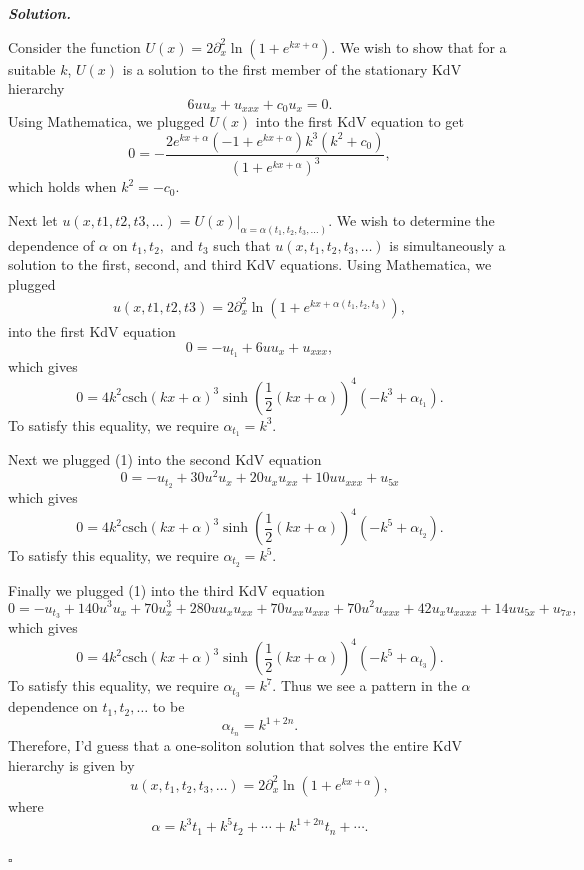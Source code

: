 \documentclass[12pt]{report}
\newenvironment{solution}[1][\it{Solution}]{\textbf{#1. } }{$\square$}
\newcommand{\paren}[1]{{\left(#1\right)}} %
\begin{document}
\begin{solution}

    \noindent
    Consider the function $U(x) = 2\partial_x^2\ln\left(1+e^{kx+\alpha}\right)$. We wish to show that for a suitable $k$, $U(x)$ is a solution to the first member of the stationary KdV hierarchy
    \[ 6uu_x + u_{xxx} + c_0u_x = 0.\]
    Using Mathematica, we plugged $U(x)$ into the first KdV equation to get
    \[ 0 = - \frac{2 e^{k x + \alpha} \paren{-1 + e^{k x + \alpha}}k^3(k^2+c_0)}{(1 + e^{k x + \alpha})^3},\]
    which holds when $k^2 = -c_0$. 
    
    \noindent
    Next let $u(x,t1,t2,t3,\ldots) = \left. U(x) \right|_{\alpha = \alpha(t_1,t_2,t_3,\ldots)}$. We wish to determine the dependence of $\alpha$ on $t_1, t_2,$ and $t_3$ such that $u(x,t_1,t_2,t_3,\ldots)$ is simultaneously a solution to the first, second, and third KdV equations. Using Mathematica, we plugged
    \begin{align}
        u(x,t1,t2,t3) = 2\partial_x^2\ln\left(1+e^{kx+\alpha(t_1,t_2,t_3)}\right),
    \end{align} 
    into the first KdV equation
    \[ 
        0 = - u_{t_1} + 6 u u_x+u_{xxx},
    \]
    which gives
    \[ 
        0 = 4k^2\text{csch}(kx + \alpha)^3\sinh\paren{\frac{1}{2}(kx + \alpha)}^4 (-k^3 + \alpha_{t_1}).
    \]
    To satisfy this equality, we require $\alpha_{t_1} = k^3$.

    \noindent
    Next we plugged (1) into the second KdV equation
    \[ 
        0=- u_{t_2} + 30u^2u_x+20u_x u_{xx}+10u u_{xxx}+u_{5x}
    \]
    which gives
    \[ 
        0 = 4k^2\text{csch}(kx + \alpha)^3\sinh\paren{\frac{1}{2}(kx + \alpha)}^4 (-k^5 + \alpha_{t_2}).
    \]
    To satisfy this equality, we require $\alpha_{t_2} = k^5$.

    \noindent
    Finally we plugged (1) into the third KdV equation
    \[ 
        0= - u_{t_3} + 140 u^3 u_x+70 u_x^3+280 u u_x u_{xx}+70 u_{xx}u_{xxx}+70 u^2 u_{xxx}+42u_x u_{xxxx}+14 u u_{5x}+u_{7x},
    \]
    which gives
    \[ 
        0 = 4k^2\text{csch}(kx + \alpha)^3\sinh\paren{\frac{1}{2}(kx + \alpha)}^4 (-k^5 + \alpha_{t_3}).
    \]
    To satisfy this equality, we require $\alpha_{t_3} = k^7$. Thus we see a pattern in the $\alpha$ dependence on $t_1,t_2,\ldots$ to be
    \[ \alpha_{t_n} =k^{1 + 2n}.\]
    Therefore, I'd guess that a one-soliton solution that solves the entire KdV hierarchy is given by
    \[ 
        u(x,t_1,t_2,t_3,\ldots) = 2\partial_x^2\ln\left(1+e^{kx+\alpha}\right),
    \]
    where
    \[ 
        \alpha = k^3t_1 + k^5t_2 + \cdots + k^{1+2n}t_n + \cdots.
    \]


\end{solution}
\end{document}
